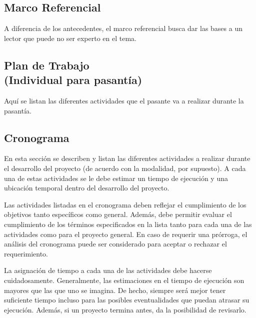 \documentclass{article}
\begin{document}
\subsection*{Marco Referencial}
\noindent A diferencia de los antecedentes, el marco referencial busca dar las bases a un lector que puede  no ser experto en el tema. %

\subsection*{Plan de Trabajo \\ {\scriptsize (Individual para pasantía)}}
\noindent Aquí se listan las diferentes actividades que el pasante va a realizar durante la pasantía.

\subsection*{Cronograma}
\noindent En esta sección se describen y listan las diferentes actividades a realizar durante el desarrollo del proyecto (de acuerdo con la modalidad, por supuesto). A cada una de estas actividades se le debe estimar un tiempo de ejecución y una ubicación temporal dentro del desarrollo del proyecto.

Las actividades listadas en el cronograma deben reflejar el cumplimiento de los objetivos tanto específicos como general. Además, debe permitir evaluar el cumplimiento de los términos especificados en la lista tanto para cada una de las actividades como para el proyecto general. En caso de requerir una prórroga, el análisis del cronograma puede ser considerado para aceptar o rechazar el requerimiento.

La asignación de tiempo a cada una de las actividades debe hacerse cuidadosamente. Generalmente, las estimaciones en el tiempo de ejecución son mayores que las que uno se imagina. De hecho, siempre será mejor tener suficiente tiempo incluso para las posibles eventualidades que puedan atrasar su ejecución. Además, si un proyecto termina antes, da la posibilidad de revisarlo.
\end{document}
